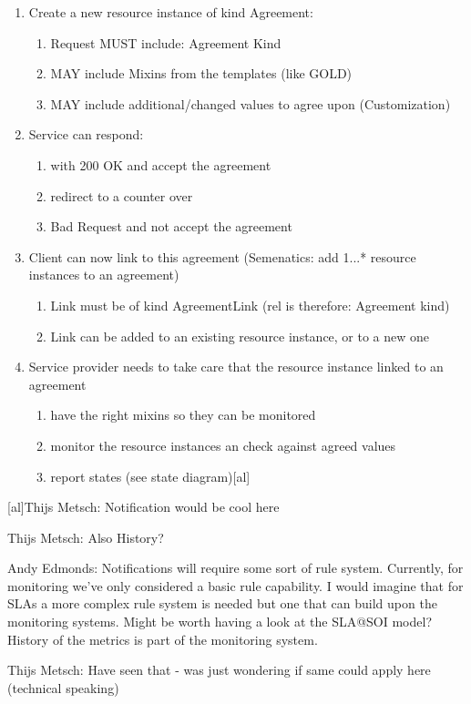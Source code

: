\documentclass[12pt]{article}  %
\begin{document}
\begin{enumerate}
\item  Create a new resource instance of kind Agreement:
   \begin{enumerate}
	\item Request MUST include: Agreement Kind
	\item MAY include Mixins from the templates (like GOLD)
	\item MAY include additional/changed values to agree upon (Customization)
   \end{enumerate}
\item  Service can respond:
   \begin{enumerate}
	\item with 200 OK and accept the agreement
	\item redirect to a counter over
	\item Bad Request and not accept the agreement
   \end{enumerate}
\item  Client can now link to this agreement (Semenatics: add 1...* resource instances to an agreement)
   \begin{enumerate}
	\item Link must be of kind AgreementLink (rel is therefore: Agreement kind)
	\item Link can be added to an existing resource instance, or to a new one
   \end{enumerate}
\item  Service provider needs to take care that the resource instance linked to an agreement
   \begin{enumerate}
	\item have the right mixins so they can be monitored
	\item monitor the resource instances an check against agreed values
	\item report states (see state diagram)[al]
   \end{enumerate}
\end{enumerate}

{
\color{blue}
[al]Thijs Metsch:
Notification would be cool here

Thijs Metsch:
Also History?

Andy Edmonds:
Notifications will require some sort of rule system. Currently, for monitoring we've only considered a basic rule capability. I would imagine that for SLAs a more complex rule system is needed but one that can build upon the monitoring systems. Might be worth having a look at the SLA@SOI model? History of the metrics is part of the monitoring system.

Thijs Metsch:
Have seen that - was just wondering if same could apply here (technical speaking)
}
\end{document}
